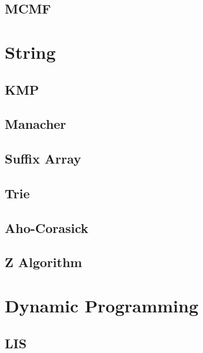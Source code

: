 \documentclass[10pt,landscape,a4paper,twocolumn]{article}
\begin{document}
\subsection{MCMF}



\section{String}
\subsection{KMP}


\subsection{Manacher}


\subsection{Suffix Array}


\subsection{Trie}


\subsection{Aho-Corasick}


\subsection{Z Algorithm}


\section {Dynamic Programming}

\subsection{LIS}

\end{document}
